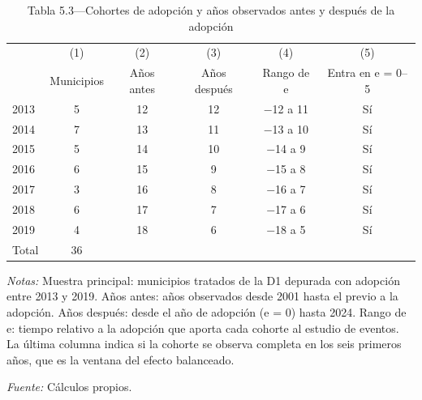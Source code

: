 \begin{table}[htbp]
\centering
\small
\caption{Tabla 5.3—Cohortes de adopción y años observados antes y después de la adopción}
\label{tab:tabla_5_3}
\begin{threeparttable}
\begin{tabular}{@{}lccccc@{}}
\toprule
 & (1) & (2) & (3) & (4) & (5) \\
 & Municipios & Años antes & Años después & Rango de e & Entra en e = 0--5 \\
\midrule
2013 & 5 & 12 & 12 & $-$12 a 11 & Sí \\
2014 & 7 & 13 & 11 & $-$13 a 10 & Sí \\
2015 & 5 & 14 & 10 & $-$14 a 9 & Sí \\
2016 & 6 & 15 & 9 & $-$15 a 8 & Sí \\
2017 & 3 & 16 & 8 & $-$16 a 7 & Sí \\
2018 & 6 & 17 & 7 & $-$17 a 6 & Sí \\
2019 & 4 & 18 & 6 & $-$18 a 5 & Sí \\
\midrule
Total & 36 &  &  &  &  \\
\bottomrule
\end{tabular}
\begin{tablenotes}[flushleft]
\footnotesize
\item \textit{Notas:} Muestra principal: municipios tratados de la D1 depurada con adopción entre 2013 y 2019. Años antes: años observados desde 2001 hasta el previo a la adopción. Años después: desde el año de adopción (e = 0) hasta 2024. Rango de e: tiempo relativo a la adopción que aporta cada cohorte al estudio de eventos. La última columna indica si la cohorte se observa completa en los seis primeros años, que es la ventana del efecto balanceado.
\item \textit{Fuente:} Cálculos propios.
\end{tablenotes}
\end{threeparttable}
\end{table}
